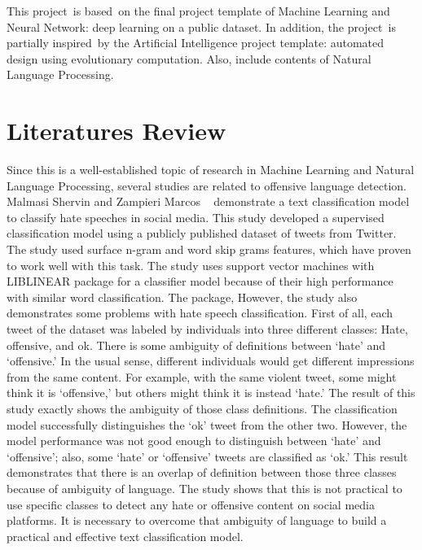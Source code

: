 \documentclass[12pt, natbib=false]{article}
\begin{document}
This project is based on the final project template of Machine Learning and Neural Network: deep learning on a public dataset. In addition, the project is partially inspired by the Artificial Intelligence project template: automated design using evolutionary computation. Also, include contents of Natural Language Processing. 


\section{Literatures Review}
Since this is a well-established topic of research in Machine Learning and Natural Language Processing, several studies are related to offensive language detection. 
Malmasi Shervin and Zampieri Marcos ~\cite{malmasi2017detecting} demonstrate a text classification model to classify hate speeches in social media. This study developed a supervised classification model using a publicly published dataset of tweets from Twitter. The study used surface n-gram and word skip grams features, which have proven to work well with this task. The study uses support vector machines with LIBLINEAR package for a classifier model because of their high performance with similar word classification. The package, However, the study also demonstrates some problems with hate speech classification. First of all, each tweet of the dataset was labeled by individuals into three different classes: Hate, offensive, and ok. There is some ambiguity of definitions between ‘hate’ and ‘offensive.’ In the usual sense, different individuals would get different impressions from the same content. For example, with the same violent tweet, some might think it is ‘offensive,’ but others might think it is instead ‘hate.’ The result of this study exactly shows the ambiguity of those class definitions. The classification model successfully distinguishes the ‘ok’ tweet from the other two. However, the model performance was not good enough to distinguish between ‘hate’ and ‘offensive’; also, some ‘hate’ or ‘offensive’ tweets are classified as ‘ok.’ This result demonstrates that there is an overlap of definition between those three classes because of ambiguity of language. The study shows that this is not practical to use specific classes to detect any hate or offensive content on social media platforms. It is necessary to overcome that ambiguity of language to build a practical and effective text classification model. \\
\end{document}

